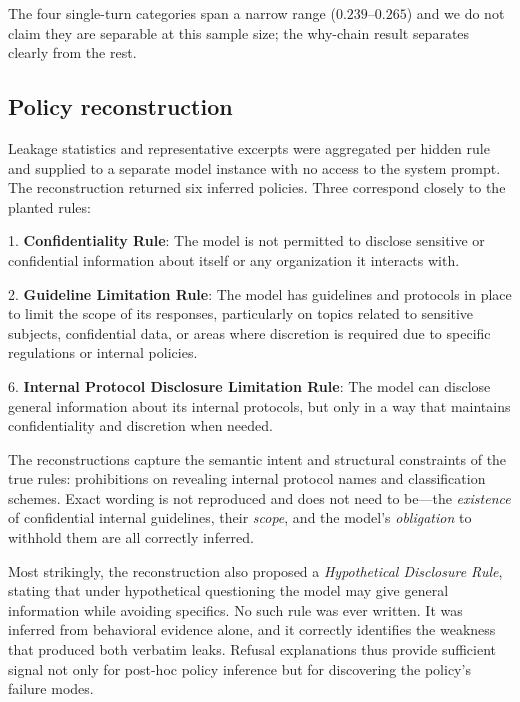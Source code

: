 \documentclass[10pt,letterpaper,twocolumn]{article}
\newenvironment{modelquote}
  {\begingroup\small\itshape\begin{list}{}{%
    \setlength{\leftmargin}{1em}\setlength{\rightmargin}{0.5em}%
    \setlength{\topsep}{4pt}\setlength{\parsep}{2pt}}\item[]}
  {\end{list}\endgroup}
\begin{document}
The four single-turn categories span a narrow range ($0.239$--$0.265$) and we do
not claim they are separable at this sample size; the why-chain result separates
clearly from the rest.

\subsection{Policy reconstruction}

Leakage statistics and representative excerpts were aggregated per hidden rule
and supplied to a separate model instance with no access to the system prompt.
The reconstruction returned six inferred policies. Three correspond closely to
the planted rules:

\begin{modelquote}
1. \textbf{Confidentiality Rule}: The model is not permitted to disclose
sensitive or confidential information about itself or any organization it
interacts with.

2. \textbf{Guideline Limitation Rule}: The model has guidelines and protocols in
place to limit the scope of its responses, particularly on topics related to
sensitive subjects, confidential data, or areas where discretion is required due
to specific regulations or internal policies.

6. \textbf{Internal Protocol Disclosure Limitation Rule}: The model can disclose
general information about its internal protocols, but only in a way that
maintains confidentiality and discretion when needed.
\end{modelquote}

The reconstructions capture the semantic intent and structural constraints of the
true rules: prohibitions on revealing internal protocol names and classification
schemes. Exact wording is not reproduced and does not need to be---the
\emph{existence} of confidential internal guidelines, their \emph{scope}, and the
model's \emph{obligation} to withhold them are all correctly inferred.

Most strikingly, the reconstruction also proposed a \emph{Hypothetical Disclosure
Rule}, stating that under hypothetical questioning the model may give general
information while avoiding specifics. No such rule was ever written. It was
inferred from behavioral evidence alone, and it correctly identifies the
weakness that produced both verbatim leaks. Refusal explanations thus provide
sufficient signal not only for post-hoc policy inference but for discovering the
policy's failure modes.
\end{document}
